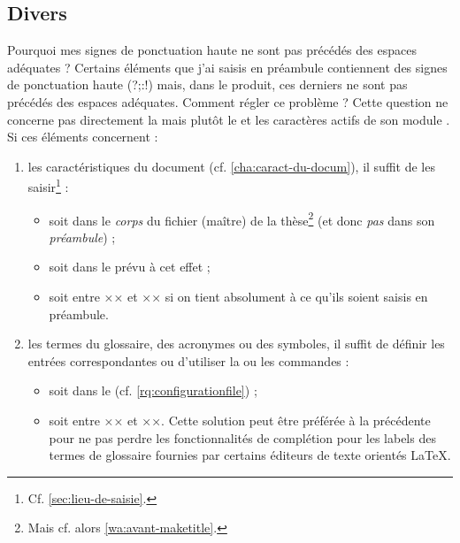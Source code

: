 \subsection{Divers}
\label{sec:divers}

\begin{dbfaq}{Pourquoi mes signes de ponctuation haute ne sont pas précédés des
    espaces adéquates ?}{}
  Certains éléments que j'ai saisis en préambule contiennent des signes de
  ponctuation haute ({\NoAutoSpacing?;:!}) mais, dans le \pdf produit, ces
  derniers ne sont pas précédés des espaces adéquates. Comment régler ce
  problème ?
  \tcblower
  Cette question ne concerne pas directement la \yatcl{} mais plutôt le
   et les caractères actifs de son module . Si
  ces éléments concernent :
  \begin{enumerate}
  \item les caractéristiques du document (cf. \vref{cha:caract-du-docum}), il
    suffit de les saisir\footnote{Cf. \vref{sec:lieu-de-saisie}.} :
    \begin{itemize}
    \item soit dans le \emph{corps} du fichier (maître) de la
      thèse\footnote{Mais cf. alors \vref{wa:avant-maketitle}.} (et donc
      \emph{pas} dans son \emph{préambule}) ;
    \item soit dans le \File{\characteristicsfile} prévu à cet effet ;
    \item soit entre ×× et ×× si on tient
      absolument à ce qu'ils soient saisis en préambule.
    \end{itemize}
  \item les termes du glossaire, des acronymes ou des symboles, il suffit de
    définir les entrées correspondantes ou d'utiliser la ou les commandes
     :
    \begin{itemize}
    \item soit dans le \File{\configurationfile}
      (cf. \vref{rq:configurationfile}) ;
    \item soit entre ×× et ××. Cette
      solution peut être préférée à la précédente pour ne pas perdre les
      fonctionnalités de complétion pour les labels des termes de glossaire
      fournies par certains éditeurs de texte orientés \LaTeX{}.
    \end{itemize}
  \end{enumerate}
\end{dbfaq}

